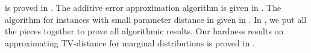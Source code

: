  is proved in . The additive error approximation algorithm is given in . The algorithm for instances with small parameter distance in given in . In , we put all the pieces together to prove all algorithmic results. 
Our hardness results on approximating TV-distance for marginal distributions is proved in .

